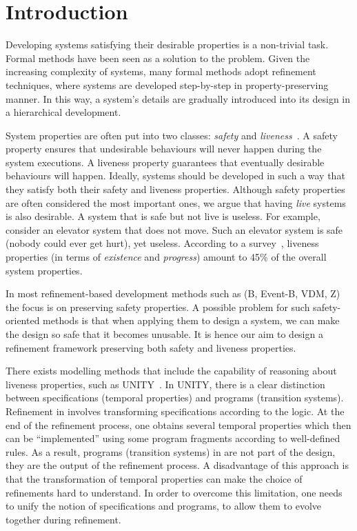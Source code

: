 \section{Introduction}
\label{sec:introduction}

Developing systems satisfying their desirable properties is a
non-trivial task.  Formal methods have been seen as a solution to the
problem.  Given the increasing complexity of systems, many
formal methods adopt refinement techniques, where systems are
developed step-by-step in property-preserving manner.  In this way,
a system's details are gradually introduced into its design in
a hierarchical development.

System properties are often put into two classes: \emph{safety}
and \emph{liveness}~\cite{DBLP:journals/tse/Lamport77}.  A safety
property ensures that undesirable behaviours will never happen
during the system executions.  A liveness property guarantees that
eventually desirable behaviours will happen.  Ideally, systems should
be developed in such a way that they satisfy both their safety and liveness
properties.  Although safety properties are often considered the most
important ones, we argue that having \emph{live} systems is also desirable.
A system that is safe but not live is useless.  For example, consider
an elevator system that does not move. Such an elevator system is safe
(nobody could ever get hurt), yet useless.  According to a
survey~\cite{DBLP:conf/icse/DwyerAC99}, liveness properties (in terms
of \emph{existence} and \emph{progress}) amount to 45\% of the overall
system properties.

In most refinement-based development methods such as (B, Event-B, VDM,
Z) the focus is on preserving safety properties.  A possible problem
for such safety-oriented methods is that when applying them to design a
system, we can make the design so safe that it becomes unusable.  It is
hence our aim to design a refinement framework preserving both safety
and liveness properties.

There exists modelling methods that include the capability of reasoning
about liveness properties, such as
UNITY~\cite{DBLP:books/daglib/0067338}.  In UNITY, there is a clear
distinction between specifications (temporal properties) and programs
(transition systems).  Refinement in \unity involves transforming
specifications according to the \unity logic.  At the end of the
refinement process, one obtains several temporal properties which then
can be ``implemented'' using some program fragments according to
well-defined rules.  As a result, programs (transition systems) in
\unity are not part of the design, they are the output of the
refinement process.  A disadvantage of this approach is that the
transformation of temporal properties can make the
choice of refinements hard to understand.  In order to overcome 
this limitation, one needs to unify the notion of specifications and 
programs, to allow them to evolve together during refinement.

